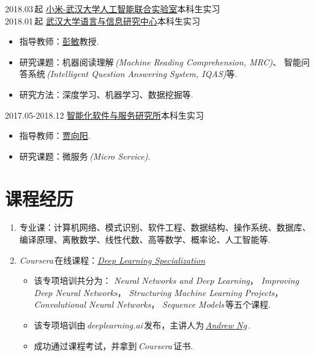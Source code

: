 \documentclass[letterpaper,AutoFakeBold]{twentysecondcv} %
\begin{document}
2018.03\,起 \qquad\qquad \href{cs.whu.edu.cn/news_show.aspx?id=871}{小米-武汉大学人工智能联合实验室}\hfill 本科生实习
\\2018.01\,起 \qquad\qquad \href{http://sc.whu.edu.cn/}{武汉大学语言与信息研究中心}\hfill 本科生实习
\begin{itemize}
	\item 指导教师：\href{http://li3.whu.edu.cn/article/56.html}{彭敏}教授.
	\item 研究课题：机器阅读理解\,\emph{(Machine Reading Comprehension, MRC)}、
	智能问答系统\,\emph{(Intelligent Question Answering System, IQAS)}等.
	\item 研究方法：深度学习、机器学习、数据挖掘等.
\end{itemize}
2017.05-2018.12 \qquad \href{http://csold.whu.edu.cn/plus/view.php?aid=18}{智能化软件与服务研究所}\hfill 本科生实习
\begin{itemize}
	\item 指导教师：\href{http://cs.whu.edu.cn/teacherinfo.aspx?id=201}{贾向阳}.
	\item 研究课题：微服务\,\emph{(Micro Service)}.
\end{itemize}




\section{\large 课程经历}


\begin{enumerate}
	\setlength{\itemsep}{0pt}
	\setlength{\parsep}{0pt}
	\setlength{\parskip}{0pt}
	\item 专业课：计算机网络、模式识别、软件工程、数据结构、操作系统、数据库、编译原理、离散数学、线性代数、高等数学、概率论、人工智能等.
	\item \emph{Coursera\,}在线课程：\href{https://www.coursera.org/specializations/deep-learning}{\emph{Deep Learning Specialization}}
		\begin{itemize}
			\item 该专项培训共分为：
			\emph{Neural Networks and Deep Learning}，
			\emph{Improving Deep Neural Networks}，
			\emph{Structuring Machine Learning Projects}，
			\emph{Convolutional Neural Networks}，
			\emph{Sequence Models}\,等五个课程.
			\item 该专项培训由\,\emph{deeplearning.ai}\,发布，主讲人为\,\href{https://www.coursera.org/instructor/andrewng}{\emph{Andrew Ng}}\,.
			\item 成功通过课程考试，并拿到\,\emph{Coursera}\,证书.
		\end{itemize}
\end{enumerate}
\end{document}
